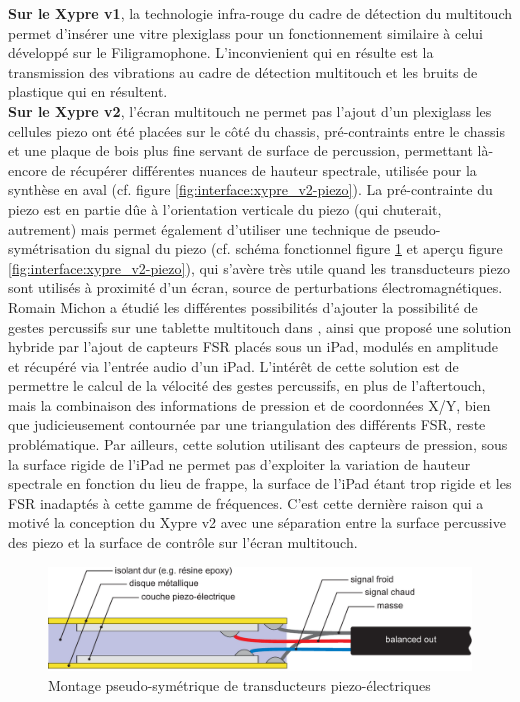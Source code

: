 \indent \textbf{Sur le Xypre v1}, la technologie infra-rouge du cadre de détection du multitouch permet d'insérer une vitre plexiglass pour un fonctionnement similaire à celui développé sur le Filigramophone. L'inconvienient qui en résulte est la transmission des vibrations au cadre de détection multitouch et les bruits de plastique qui en résultent.\\
\indent \textbf{Sur le Xypre v2}, l'écran multitouch ne permet pas l'ajout d'un plexiglass les cellules piezo ont été placées sur le côté du chassis, pré-contraints entre le chassis et une plaque de bois plus fine servant de surface de percussion, permettant là-encore de récupérer différentes nuances de hauteur spectrale, utilisée pour la synthèse en aval (cf. figure \ref{fig:interface:xypre_v2-piezo}). La pré-contrainte du piezo est en partie dûe à l'orientation verticale du piezo (qui chuterait, autrement) mais permet également d'utiliser une technique de pseudo-symétrisation du signal du piezo (cf. schéma fonctionnel figure \ref{fig:interface:balancedPiezo} et aperçu figure \ref{fig:interface:xypre_v2-piezo}), qui s'avère très utile quand les transducteurs piezo sont utilisés à proximité d'un écran, source de perturbations électromagnétiques. Romain Michon a étudié les différentes possibilités d'ajouter la possibilité de gestes percussifs sur une tablette multitouch dans \cite{michon_nuance_2016}, ainsi que proposé une solution hybride par l'ajout de capteurs \gls{FSR} placés sous un iPad, modulés en amplitude et récupéré via l'entrée audio d'un iPad. L'intérêt de cette solution est de permettre le calcul de la vélocité des gestes percussifs, en plus de l'aftertouch, mais la combinaison des informations de pression et de coordonnées X/Y, bien que judicieusement contournée par une triangulation des différents \gls{FSR}, reste problématique. Par ailleurs, cette solution utilisant des capteurs de pression, sous la surface rigide de l'iPad ne permet pas d'exploiter la variation de hauteur spectrale en fonction du lieu de frappe, la surface de l'iPad étant trop rigide et les \gls{FSR} inadaptés à cette gamme de fréquences. C'est cette dernière raison qui a motivé la conception du Xypre v2 avec une séparation entre la surface percussive des piezo et la surface de contrôle sur l'écran multitouch.

\begin{figure}[!htbp]
	\includegraphics[width=\textwidth]{gfx/05_interfaces/balancedPiezo.pdf}
	\caption{Montage pseudo-symétrique de transducteurs piezo-électriques}
	\label{fig:interface:balancedPiezo}
\end{figure}

